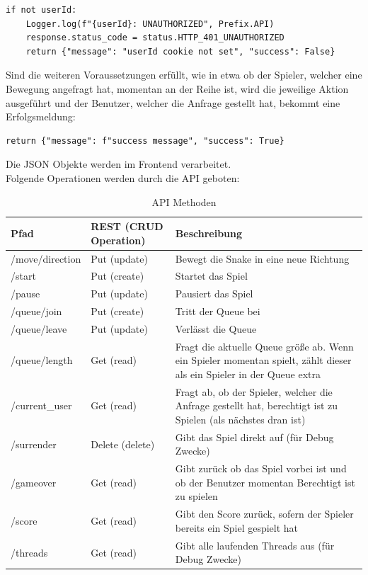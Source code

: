 \documentclass[a4paper,12pt]{scrartcl}
\begin{document}
\begin{lstlisting}
if not userId:
	Logger.log(f"{userId}: UNAUTHORIZED", Prefix.API)
	response.status_code = status.HTTP_401_UNAUTHORIZED
	return {"message": "userId cookie not set", "success": False}
\end{lstlisting}

Sind die weiteren Voraussetzungen erfüllt, wie in etwa ob der Spieler, welcher eine Bewegung angefragt hat, momentan an der Reihe ist, wird die jeweilige Aktion ausgeführt und der Benutzer, welcher die Anfrage gestellt hat, bekommt eine Erfolgsmeldung:

\begin{lstlisting}
return {"message": f"success message", "success": True}
\end{lstlisting}

Die JSON Objekte werden im Frontend verarbeitet.\\
Folgende Operationen werden durch die API geboten:
\newpage
\begin{table}[!htb]
\centering
\begin{tabular}{p{4cm}|p{4cm}|p{8cm}}
Pfad & REST (CRUD Operation) & Beschreibung \\
\hline
/move/{direction} & Put (update) & Bewegt die Snake in eine neue Richtung \\
/start & Put (create) & Startet das Spiel \\
/pause & Put (update) & Pausiert das Spiel \\
/queue/join & Put (create) & Tritt der Queue bei \\
/queue/leave & Put (update) & Verlässt die Queue \\
/queue/length & Get (read) & Fragt die aktuelle Queue größe ab. Wenn ein Spieler momentan spielt, zählt dieser als ein Spieler in der Queue extra \\
/current\_user & Get (read) & Fragt ab, ob der Spieler, welcher die Anfrage gestellt hat, berechtigt ist zu Spielen (als nächstes dran ist) \\
/surrender & Delete (delete) & Gibt das Spiel direkt auf (für Debug Zwecke) \\
/gameover & Get (read) & Gibt zurück ob das Spiel vorbei ist und ob der Benutzer momentan Berechtigt ist zu spielen \\
/score & Get (read) & Gibt den Score zurück, sofern der Spieler bereits ein Spiel gespielt hat \\
/threads & Get (read) & Gibt alle laufenden Threads aus (für Debug Zwecke)
\end{tabular}
\caption{API Methoden}
\end{table}
\end{document}
